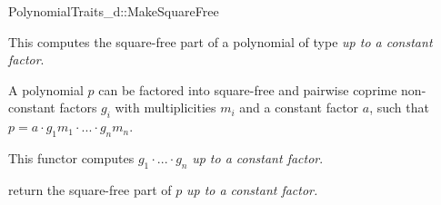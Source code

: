 \begin{ccRefConcept}{PolynomialTraits_d::MakeSquareFree}
\ccDefinition

This  computes the square-free part of 
a polynomial of type   
{\em up to a constant factor}.  

A polynomial $p$ can be  factored into square-free and pairwise coprime 
non-constant factors $g_i$ with multiplicities $m_i$ and a constant factor $a$, 
such that $p = a  \cdot  g_1m_1  \cdot  ...  \cdot  g_nm_n$.


This functor computes  $g_1  \cdot  ...  \cdot  g_n$ {\em up to a constant factor}. 

\ccRefines 
{}

\ccTypes

\ccGlue
{}

\ccOperations
{}
         { return the square-free part of $p$ {\em up to a constant factor.} }



\ccSeeAlso

\\
\end{ccRefConcept}
